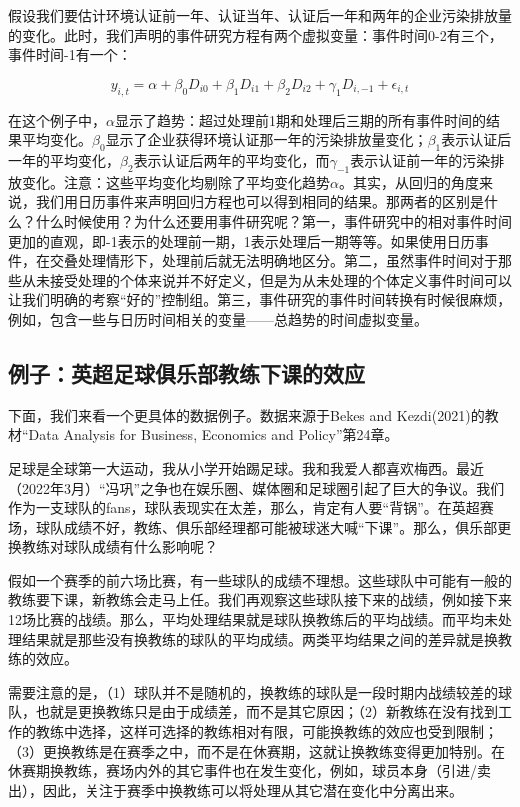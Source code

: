 \documentclass[cn,12pt,math=newtx,citestyle=gb7714-2015,bibstyle=gb7714-2015]{elegantbook}
\begin{document}
	    假设我们要估计环境认证前一年、认证当年、认证后一年和两年的企业污染排放量的变化。此时，我们声明的事件研究方程有两个虚拟变量：事件时间0-2有三个，事件时间-1有一个：
	    
	    \begin{equation}
	    y_{i,t} = \alpha + \beta_0 D_{i0} + \beta_1 D_{i1} + \beta_2 D_{i2} + \gamma_1 D_{i,-1}+\epsilon_{i,t}
	    \end{equation}
	
	    在这个例子中，$\alpha$显示了趋势：超过处理前1期和处理后三期的所有事件时间的结果平均变化。$\beta_0$显示了企业获得环境认证那一年的污染排放量变化；$\beta_1$表示认证后一年的平均变化，$\beta_2$表示认证后两年的平均变化，而$\gamma_{-1}$表示认证前一年的污染排放变化。注意：这些平均变化均剔除了平均变化趋势$\alpha$。其实，从回归的角度来说，我们用日历事件来声明回归方程也可以得到相同的结果。那两者的区别是什么？什么时候使用？为什么还要用事件研究呢？第一，事件研究中的相对事件时间更加的直观，即-1表示的处理前一期，1表示处理后一期等等。如果使用日历事件，在交叠处理情形下，处理前后就无法明确地区分。第二，虽然事件时间对于那些从未接受处理的个体来说并不好定义，但是为从未处理的个体定义事件时间可以让我们明确的考察“好的”控制组。第三，事件研究的事件时间转换有时候很麻烦，例如，包含一些与日历时间相关的变量——总趋势的时间虚拟变量。
	    
	    \subsection*{例子：英超足球俱乐部教练下课的效应}
	    
	    下面，我们来看一个更具体的数据例子。数据来源于Bekes and Kezdi(2021)的教材“Data Analysis for Business, Economics and Policy”第24章。
	    
	    足球是全球第一大运动，我从小学开始踢足球。我和我爱人都喜欢梅西。最近（2022年3月）“冯巩”之争也在娱乐圈、媒体圈和足球圈引起了巨大的争议。我们作为一支球队的fans，球队表现实在太差，那么，肯定有人要“背锅”。在英超赛场，球队成绩不好，教练、俱乐部经理都可能被球迷大喊“下课”。那么，俱乐部更换教练对球队成绩有什么影响呢？
	    
	    假如一个赛季的前六场比赛，有一些球队的成绩不理想。这些球队中可能有一般的教练要下课，新教练会走马上任。我们再观察这些球队接下来的战绩，例如接下来12场比赛的战绩。那么，平均处理结果就是球队换教练后的平均战绩。而平均未处理结果就是那些没有换教练的球队的平均成绩。两类平均结果之间的差异就是换教练的效应。
	    
	    需要注意的是，（1）球队并不是随机的，换教练的球队是一段时期内战绩较差的球队，也就是更换教练只是由于成绩差，而不是其它原因；（2）新教练在没有找到工作的教练中选择，这样可选择的教练相对有限，可能换教练的效应也受到限制；（3）更换教练是在赛季之中，而不是在休赛期，这就让换教练变得更加特别。在休赛期换教练，赛场内外的其它事件也在发生变化，例如，球员本身（引进/卖出），因此，关注于赛季中换教练可以将处理从其它潜在变化中分离出来。
	    
\end{document}
